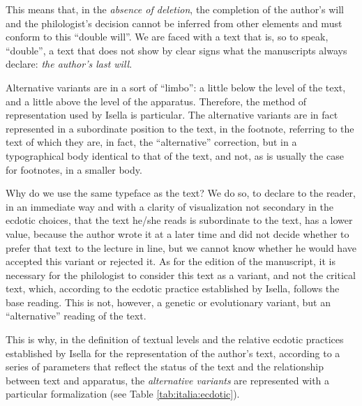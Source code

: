 \begin{paper}
This means that, in the \emph{absence of deletion}, the completion of
the author's will and the philologist's decision cannot be inferred from
other elements and must conform to this ``double will''. We are
faced with a text that is, so to speak, ``double'', a text that does not
show by clear signs what the manuscripts always declare: \emph{the
author's last will}.

Alternative variants are in a sort of ``limbo'': a little below the level
of the text, and a little above the level of the apparatus. Therefore,
the method of representation used by Isella is particular. The
alternative variants are in fact represented in a subordinate position
to the text, in the footnote, referring to the text of which they are,
in fact, the ``alternative'' correction, but in a typographical body
identical to that of the text, and not, as is usually the case for
footnotes, in a smaller body.

Why do we use the same typeface as the text? We do so, to declare to the
reader, in an immediate way and with a clarity of visualization not
secondary in the ecdotic choices, that the text he/she reads is
subordinate to the text, has a lower value, because the author wrote it
at a later time and did not decide whether to prefer that text to the
lecture in line, but we cannot know whether he would have accepted this
variant or rejected it. As for the edition of the manuscript, it is
necessary for the philologist to consider this text as a variant, and
not the critical text, which, according to the ecdotic practice
established by Isella, follows the base reading. This is not, however, a
genetic or evolutionary variant, but an ``alternative'' reading of the
text.

This is why, in the definition of textual levels and the relative
ecdotic practices established by Isella for the representation of the
author's text, according to a series of parameters that reflect the
status of the text and the relationship between text and apparatus, the
\emph{alternative variants} are represented with a particular
formalization (see Table \ref{tab:italia:ecdotic}).


\end{paper}
